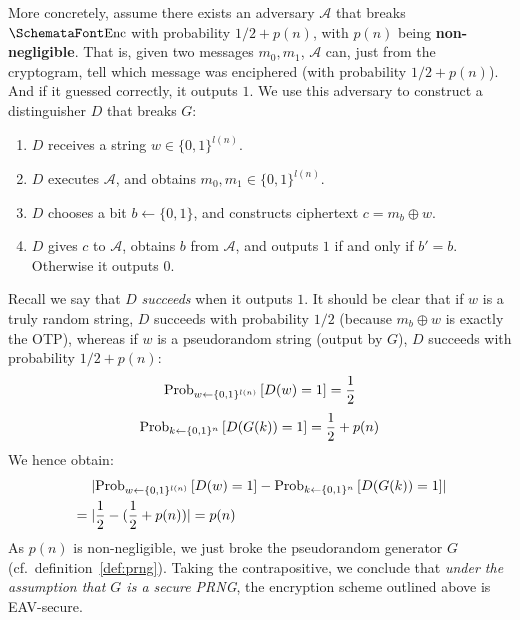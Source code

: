   More concretely, assume there exists an adversary $\mathcal{A}$ that breaks $\myemph{Enc}$ with probability $1/2 + p(n)$, with $p(n)$ being \textbf{non-negligible}. That is, given two messages $m_0, m_1$, $\mathcal{A}$ can, just from the cryptogram, tell which message was enciphered (with probability $1/2 + p(n)$). And if it guessed correctly, it outputs $1$. We use this adversary to construct a distinguisher $D$ that breaks $G$:
  \begin{enumerate}
    \item $D$ receives a string $w\in \{0, 1\}^{l(n)}$.
    \item $D$ executes $\mathcal{A}$, and obtains $m_0, m_1\in \{0, 1\}^{l(n)}$.
    \item $D$ chooses a bit $b \leftarrow \{0, 1\}$, and constructs ciphertext $c = m_b \oplus w$.
    \item $D$ gives $c$ to $\mathcal{A}$, obtains $b$ from $\mathcal{A}$, and outputs $1$ if and only if $b' = b$. Otherwise it outputs $0$.
  \end{enumerate}
  Recall we say that $D$ \emph{succeeds} when it outputs $1$. It should be clear that if $w$ is a truly random string, $D$ succeeds with probability $1/2$ (because $m_b \oplus w$ is exactly the OTP), whereas if $w$ is a pseudorandom string (output by $G$), $D$ succeeds with probability $1/2 + p(n)$:
  \begin{equation}
    \textup{Prob}_{w \leftarrow \{0, 1\}^{l(n)}}\left[D(w) = 1\right] = \frac{1}{2}
  \end{equation}
  \begin{equation}
    \textup{Prob}_{k \leftarrow \{0, 1\}^{n}}\left[D(G(k)) = 1\right] = \frac{1}{2} + p(n)
  \end{equation}
  We hence obtain:
  \begin{align}
    &\phantom{{}={}}\abs{\textup{Prob}_{w \leftarrow \{0, 1\}^{l(n)}}\left[D(w) = 1\right] - \textup{Prob}_{k \leftarrow \{0, 1\}^{n}}\left[D(G(k)) = 1\right]} \\
    &= \abs{\frac{1}{2} - \parens{\frac{1}{2} + p(n)}} = p(n)
  \end{align}
  As $p(n)$ is non-negligible, we just broke the pseudorandom generator $G$ (cf.\ definition~\ref{def:prng}). Taking the contrapositive, we conclude that \emph{under the assumption that $G$ is a secure PRNG}, the encryption scheme outlined above is EAV-secure.

